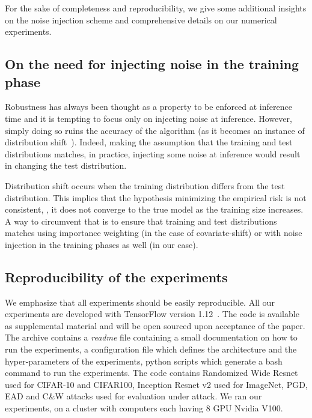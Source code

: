 For the sake of completeness and reproducibility, we give some additional insights on the noise injection scheme and comprehensive details on our numerical experiments.

\subsection{On the need for injecting noise in the training phase}
\label{section:ap2-covariateshift-appendix}

Robustness has always been thought as a property to be enforced at inference time and it is tempting to focus only on injecting noise at inference.
However, simply doing so ruins the accuracy of the algorithm (as it becomes an instance of distribution shift~\cite{sugiyama2012machine}).
Indeed, making the assumption that the training and test distributions matches, in practice, injecting some noise at inference would result in changing the test distribution.

Distribution shift occurs when the training distribution differs from the test distribution.
This implies that the hypothesis minimizing the empirical risk is not consistent, \ie, it does not converge to the true model as the training size increases.
A way to circumvent that is to ensure that training and test distributions matches using importance weighting (in the case of covariate-shift) or with noise injection in the training phases as well (in our case).


\subsection{Reproducibility of the  experiments}

We emphasize that all experiments should be easily reproducible.
All our experiments are developed with TensorFlow version 1.12~\cite{tensorflow2015-whitepaper}.
The code is available as supplemental material and will be open sourced upon acceptance of the paper.
The archive contains a \emph{readme} file containing a small documentation on how to run the experiments, a configuration file which defines the architecture and the hyper-parameters of the experiments, python scripts which generate a bash command to run the experiments.
The code contains Randomized Wide Resnet used for CIFAR-10 and CIFAR100, Inception Resnet v2 used for ImageNet, PGD, EAD and C\&W attacks used for evaluation under attack.
We ran our experiments, on a cluster with computers each having 8 GPU Nvidia V100. 








